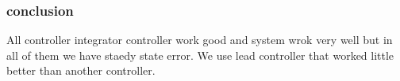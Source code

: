 \subsubsection{conclusion}
All controller integrator controller work good and system wrok very well but in all of them we have staedy state error. We use lead controller that worked little better than another controller.